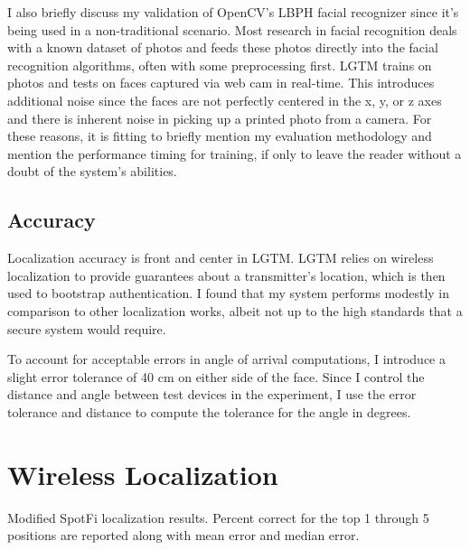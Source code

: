 \documentclass[12pt]{report}
\begin{document}
I also briefly discuss my validation of OpenCV's LBPH facial recognizer since it's being used in a non-traditional scenario. Most research in facial recognition deals with a known dataset of photos and feeds these photos directly into the facial recognition algorithms, often with some preprocessing first. LGTM trains on photos and tests on faces captured via web cam in real-time. This introduces additional noise since the faces are not perfectly centered in the x, y, or z axes and there is inherent noise in picking up a printed photo from a camera. For these reasons, it is fitting to briefly mention my evaluation methodology and mention the performance timing for training, if only to leave the reader without a doubt of the system's abilities. \par

\subsection{Accuracy}
Localization accuracy is front and center in LGTM. LGTM relies on wireless localization to provide guarantees about a transmitter's location, which is then used to bootstrap authentication. I found that my system performs modestly in comparison to other localization works, albeit not up to the high standards that a secure system would require. \par

To account for acceptable errors in angle of arrival computations, I introduce a slight error tolerance of 40 cm on either side of the face. Since I control the distance and angle between test devices in the experiment, I use the error tolerance and distance to compute the tolerance for the angle in degrees. \par

\section{Wireless Localization}
\begin{table}
    \begin{center}
        \caption{Modified SpotFi localization results. Percent correct for the top 1 through 5 positions are reported along with mean error and median error.}
        \label{table: base-data-table}
                
    \end{center}
\end{table}
\end{document}
